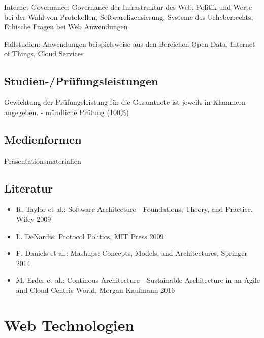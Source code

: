 Internet Governance: Governance der Infrastruktur des Web, Politik und
Werte bei der Wahl von Protokollen, Softwarelizensierung, Systeme des
Urheberrechts, Ethische Fragen bei Web Anwendungen

Fallstudien: Anwendungen beispielsweise aus den Bereichen Open Data,
Internet of Things, Cloud Services

\section*{Studien-/Prüfungsleistungen\label{/mi-2017/modulbeschreibungen-master/MA_WTW_Modul_Web-Architekturen}}\label{studien-pruxfcfungsleistungenpathlabelmi-2017modulbeschreibungen-mastermaux5fwtwux5fmodulux5fweb-architekturen}

Gewichtung der Prüfungsleistung für die Gesamtnote ist jeweils in
Klammern angegeben. - mündliche Prüfung (100\%)

\section*{Medienformen\label{/mi-2017/modulbeschreibungen-master/MA_WTW_Modul_Web-Architekturen}}\label{medienformenpathlabelmi-2017modulbeschreibungen-mastermaux5fwtwux5fmodulux5fweb-architekturen}

Präsentationsmaterialien

\section*{Literatur\label{/mi-2017/modulbeschreibungen-master/MA_WTW_Modul_Web-Architekturen}}\label{literaturpathlabelmi-2017modulbeschreibungen-mastermaux5fwtwux5fmodulux5fweb-architekturen}

\begin{itemize}
\tightlist
\item
  R. Taylor et al.: Software Architecture - Foundations, Theory, and
  Practice, Wiley 2009
\item
  L. DeNardis: Protocol Politics, MIT Press 2009
\item
  F. Daniels et al.: Mashups: Concepts, Models, and Architectures,
  Springer 2014
\item
  M. Erder et al.: Continous Architecture - Sustainable Architecture in
  an Agile and Cloud Centric World, Morgan Kaufmann 2016
\end{itemize}

\chapter{Web
Technologien\label{/mi-2017/modulbeschreibungen-master/MA_WTW_Modul_Web-Technologien}}\label{web-technologienpathlabelmi-2017modulbeschreibungen-mastermaux5fwtwux5fmodulux5fweb-technologien}

